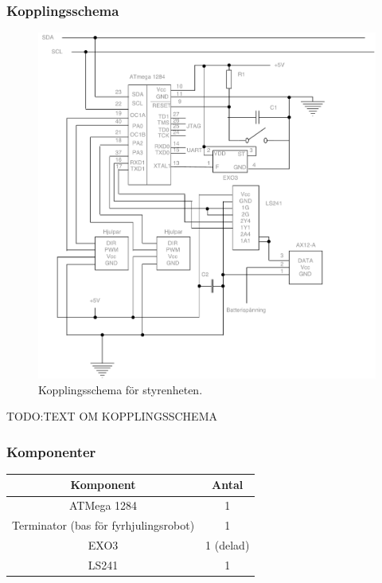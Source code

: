 \documentclass{article}
\begin{document}
\subsubsection{Kopplingsschema}
\begin{figure}[H]
\centering
\includegraphics[scale=0.45]{Styrenhet_kopplingsschema}
\caption{Kopplingsschema för styrenheten.}
\label{fig:styrenhet_kopplingsschema}
\end{figure}

TODO:TEXT OM KOPPLINGSSCHEMA

\subsubsection{Komponenter}

\begin{table}[H]
  \centering
  \begin{tabular}{ | c | c |}
    \hline
    \textbf{Komponent} & \textbf{Antal} \\
    \hline
    ATMega 1284 & 1 \\
    \hline
    Terminator (bas för fyrhjulingsrobot) & 1 \\
    \hline
    EXO3 & 1 (delad) \\
    \hline
    LS241 & 1 \\
    \hline
  \end{tabular}
\end{table}
\end{document}

